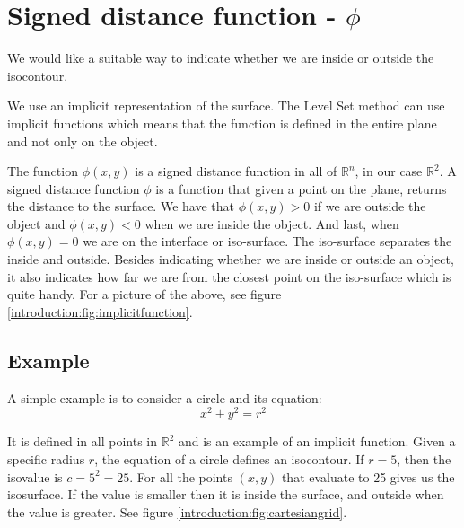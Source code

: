 

\section*{Signed distance function - $\phi$}

We would like a suitable way to indicate whether we are inside or outside the isocontour. 

We use an implicit representation of the surface. The Level Set method
can use implicit functions which means that the function is defined in
the entire plane and not only on the object.

The function $\phi(x,y)$ is a signed distance function in all of
$\mathbb{R}^{n}$, in our case $\mathbb{R}^{2}$. A signed distance
function $\phi$ is a function that given a point on the plane, returns
the distance to the surface. We have that $\phi(x,y) > 0$ if we are
outside the object and $\phi(x,y) < 0$ when we are inside the object.
And last, when $\phi(x,y) = 0$ we are on the interface or iso-surface.
The iso-surface separates the inside and outside.  Besides indicating
whether we are inside or outside an object, it also indicates how far
we are from the closest point on the iso-surface which is quite
handy. For a picture of the above, see figure
\vref{introduction:fig:implicitfunction}.



\subsection*{Example}

A simple example is to consider a circle and its equation:
\begin{equation*} 
  x^{2} + y^{2} = r^{2}
\end{equation*}

It is defined in all points in $\mathbb{R}^{2}$ and is an example of
an implicit function. Given a specific radius $r$, the equation of a
circle defines an isocontour. If $r = 5$, then the isovalue is $c =
5^{2} = 25$. For all the points $(x,y)$ that evaluate to 25 gives us
the isosurface. If the value is smaller then it is inside the surface,
and outside when the value is greater. See figure
\vref{introduction:fig:cartesiangrid}.


